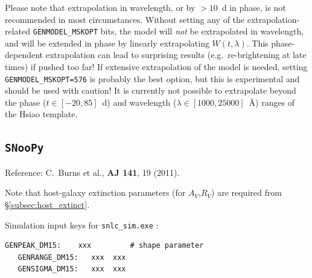\documentclass[12pt]{article}
\newcommand{\snoopy}{{\tt SNooPy}}
\begin{document}
Please note that extrapolation in wavelength, or by $>10$~d in phase, is not recommended in most
circumstances. Without setting any of the extrapolation-related \verb!GENMODEL_MSKOPT! bits, the
model will \emph{not} be extrapolated in wavelength, and will be extended in phase by linearly
extrapolating $W(t,\lambda)$. This phase-dependent extrapolation can lead to surprising results
(e.g.\ re-brightening at late times) if pushed too far! If extensive extrapolation of the model is
needed, setting \verb!GENMODEL_MSKOPT=576! is probably the best option, but this is experimental
and should be used with caution!
It is currently not possible to extrapolate beyond the phase ($t\in[-20,85]$~d) 
and wavelength ($\lambda\in[1000,25000]$~\AA) ranges of the Hsiao \cite{Hsiao2007} template.

\clearpage
\subsection{{\snoopy}}
\label{subsec:snoopy}

\noindent
Reference: C.\ Burns et al., {\bf AJ 141}, 19 (2011). \cite{Burns11} 

Note that host-galaxy extinction parameters (for $A_V$,$R_V$) 
are required from \S\ref{subsec:host_extinct}.

\noindent
Simulation input keys for {\tt snlc\_sim.exe} :
\begin{Verbatim}[frame=single]
   GENPEAK_DM15:    xxx         # shape parameter
   GENRANGE_DM15:   xxx  xxx
   GENSIGMA_DM15:   xxx  xxx  
\end{Verbatim}
\end{document}
